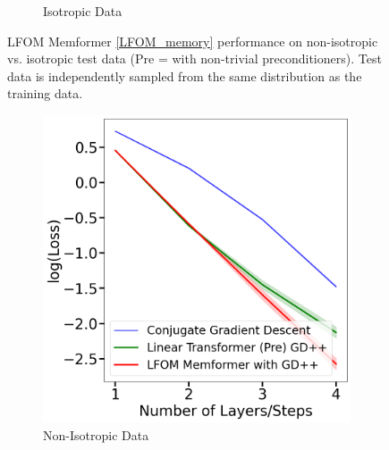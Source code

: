 \documentclass[11pt]{article}
\numberwithin{equation}{section}
\begin{document}
\begin{figure}[!htbp]
\begin{subfigure}[b]{0.45\textwidth}
    \caption{Isotropic Data}
    \label{fig:lfom_isotropic}
  \end{subfigure}
  \caption{LFOM Memformer \eqref{LFOM_memory} performance on non-isotropic vs. isotropic test data (Pre = with non-trivial preconditioners). Test data is independently sampled from the same distribution as the training data.}
  \label{fig:lfom_isotropic_vs_nonisotropic}
\end{figure}
\vspace{-5pt}

\begin{figure}[!htbp]
  \centering
  \begin{subfigure}[b]{0.45\textwidth}
    \centering
    \includegraphics[width=\textwidth]{lfom_gdpp_nonisotropic.png}
    \caption{Non-Isotropic Data}
    \label{fig:lfom_gdpp_nonisotropic}
  \end{subfigure}
  \hfill
  \begin{subfigure}[b]{0.45\textwidth}
    \centering

\end{subfigure}
\end{figure}
\end{document}

